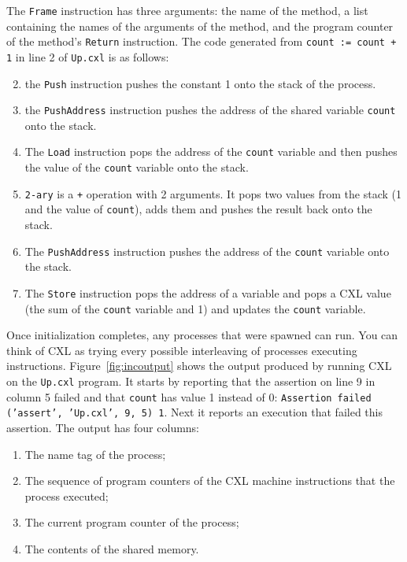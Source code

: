 \documentclass{report}
\begin{document}
The \texttt{Frame} instruction has three arguments: the name of the method,
a list containing the names of the arguments of the method, and
the program counter of the method's \texttt{Return} instruction.
The code generated from \texttt{count := count + 1} in line 2 of
\texttt{Up.cxl} is as follows:

\begin{enumerate} \setcounter{enumi}{1}
\item the \texttt{Push} instruction pushes the constant 1
onto the stack of the process.
\item the \texttt{PushAddress} instruction pushes the address of
the shared variable \texttt{count} onto the stack.
\item The \texttt{Load} instruction pops the address of the
\texttt{count} variable and then pushes the value of the
\texttt{count} variable onto the stack.
\item \texttt{2-ary} is a \texttt{+} operation with 2 arguments.
It pops two values from the stack (1 and the value of \texttt{count}),
adds them and pushes the result back onto the stack.
\item The \texttt{PushAddress} instruction pushes the address of the \texttt{count}
variable onto the stack.
\item The \texttt{Store} instruction pops the address of a variable and pops
a CXL value (the sum of the \texttt{count} variable and 1) and updates the
\texttt{count} variable.
\end{enumerate}

Once initialization completes, any processes that were spawned can run.
You can think of CXL as trying every possible interleaving of processes executing
instructions.
Figure~\ref{fig:incoutput} shows the output produced by running CXL on the
\texttt{Up.cxl} program.
It starts by reporting that the assertion on line 9 in column 5 failed and that
\texttt{count} has value 1 instead of 0:
\texttt{Assertion failed (’assert’, ’Up.cxl’, 9, 5) 1}.
Next it reports an execution that failed this assertion.  The output has
four columns:
\begin{enumerate}
\item The name tag of the process;
\item The sequence of program counters of the CXL machine instructions that the process executed;
\item The current program counter of the process;
\item The contents of the shared memory.
\end{enumerate}
\end{document}
